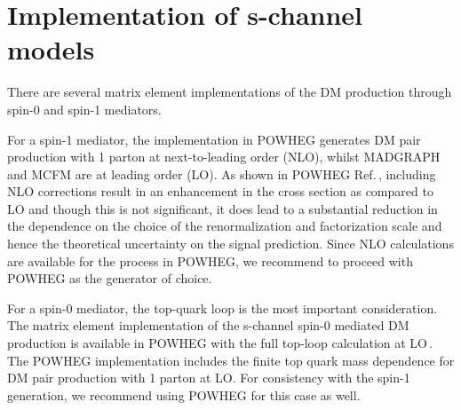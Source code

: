 \section{Implementation of s-channel models}

There are several matrix element implementations of the
DM production through spin-0 and spin-1 mediators.

For a spin-1 mediator, the implementation in POWHEG generates
DM pair production with 1 parton at next-to-leading order (NLO), whilst MADGRAPH and MCFM are at leading order (LO). As shown in POWHEG Ref.\,\cite{Haisch:2013ata}, including NLO corrections result in an enhancement in the cross section as compared to LO and though this is not significant, it does lead to a substantial reduction in the dependence on the choice of the renormalization and factorization scale and hence the theoretical uncertainty on the signal prediction. 
Since NLO calculations are available for the process in POWHEG, we recommend to proceed with POWHEG as the generator of choice. 

For a spin-0 mediator, the top-quark loop is the most important
consideration.
The matrix element implementation of the s-channel spin-0 mediated DM production is available in POWHEG with the full top-loop calculation at LO\,\cite{Haisch:2015ioa}.
The POWHEG implementation includes the finite
top quark mass dependence for DM pair production with 1 parton at LO.
For consistency with the spin-1 generation, we recommend using POWHEG
for this case as well.


